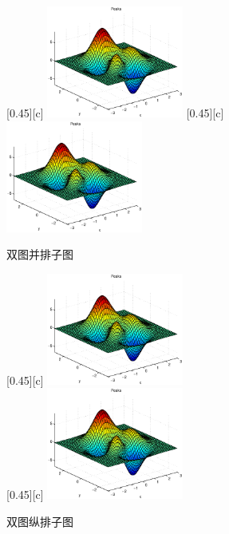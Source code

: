 \documentclass{article}
\begin{document}
    \begin{figure}[!htbp]
        \centering
        [0.45\textwidth][c]{
            \centering
            \includegraphics[width=0.4\textwidth]{example}
            \label{}
        }%
        \hspace{0.5cm} 
        [0.45\textwidth][c]{
            \centering
            \includegraphics[width=0.4\textwidth]{example}
            \label{}
        } 
        \caption{双图并排子图}
        \label{}
    \end{figure}


    \begin{figure}[!htbp]
        \centering
        [0.45\textwidth][c]{
            \centering
            \includegraphics[width=0.4\textwidth]{example}
            \label{}
        }\\[0.5cm]%
        [0.45\textwidth][c]{
            \centering
            \includegraphics[width=0.4\textwidth]{example}
            \label{}
        } 
        \caption{双图纵排子图}
        \label{}
    \end{figure}
    
\end{document}
